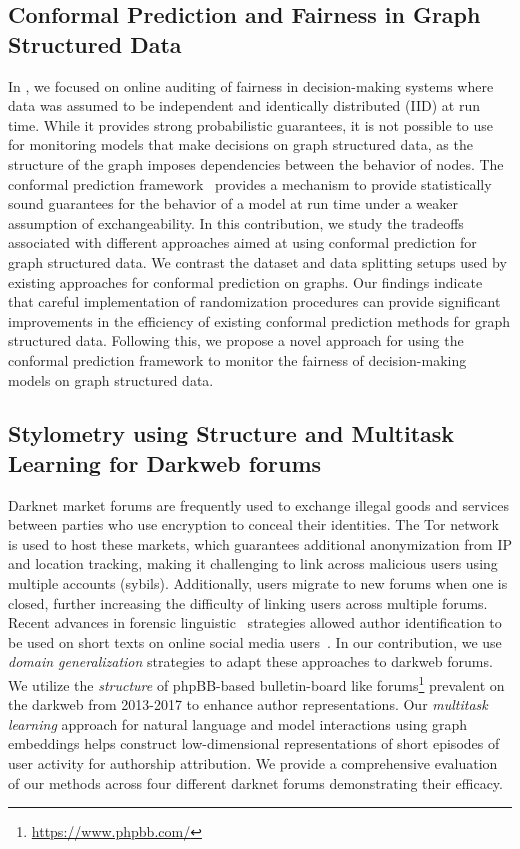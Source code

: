 \subsection{Conformal Prediction and Fairness in Graph Structured Data}
In \AVOIRmethodname{}, we focused on online auditing of fairness in decision-making systems where data was assumed to be independent and identically distributed (IID) at run time.
While it provides strong probabilistic guarantees, it is not possible to use \AVOIRmethodname{} for monitoring models that make decisions on graph structured data, as the structure of the graph imposes dependencies between the behavior of nodes.
The conformal prediction framework~\citep{vovk2005algorithmic} provides a mechanism to provide statistically sound guarantees for the behavior of a model at run time under a weaker assumption of exchangeability.
In this contribution, we study the tradeoffs associated with different approaches aimed at using conformal prediction for graph structured data.
We contrast the dataset and data splitting setups used by existing approaches for conformal prediction on graphs.  
Our findings indicate that careful implementation of randomization procedures can provide significant improvements in the efficiency of existing conformal prediction methods for graph structured data.
Following this, we propose a novel approach for using the conformal prediction framework to monitor the fairness of decision-making models on graph structured data.

\subsection{Stylometry using Structure and Multitask Learning for Darkweb forums}
Darknet market forums are frequently used to exchange illegal goods and services between parties who use encryption to conceal their identities.
The Tor network is used to host these markets, which guarantees additional anonymization from IP and location tracking, making it challenging to link across malicious users using multiple accounts (sybils).
Additionally, users migrate to new forums when one is closed, further increasing the difficulty of linking users across multiple forums. 
Recent advances in forensic linguistic~\citep{juola2008authorship} strategies allowed  author identification to be used on short texts on online social media users~\citep{shrestha2017convolutional,andrews2019learning}.
In our contribution, we use \textit{domain generalization} strategies to adapt these approaches to darkweb forums.
We utilize the \textit{structure} of phpBB-based bulletin-board like forums\footnote{\url{https://www.phpbb.com/}} prevalent on the darkweb from 2013-2017 to enhance author representations.
Our \textit{multitask learning} approach for natural language and model interactions using graph embeddings helps construct low-dimensional representations of short episodes of user activity for authorship attribution. 
We provide a comprehensive evaluation of our methods across four different darknet forums demonstrating their efficacy.

